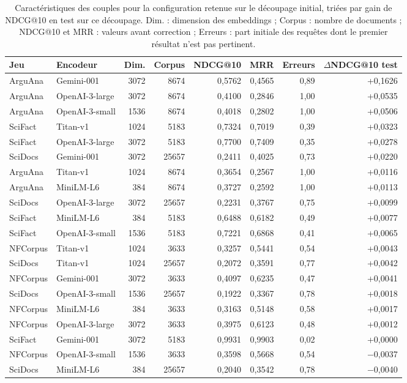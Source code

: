 \documentclass[a4paper,10pt]{article}
\begin{document}
\begin{table}[p]
\centering
\small
\begin{tabular}{llrrrrrr}
\toprule
Jeu & Encodeur & Dim. & Corpus & NDCG@10 & MRR & Erreurs & $\Delta$NDCG@10 test \\
\midrule
ArguAna & Gemini-001 & 3072 & 8674 & 0,5762 & 0,4565 & 0,89 & +0,1626 \\
ArguAna & OpenAI-3-large & 3072 & 8674 & 0,4100 & 0,2846 & 1,00 & +0,0535 \\
ArguAna & OpenAI-3-small & 1536 & 8674 & 0,4018 & 0,2802 & 1,00 & +0,0506 \\
SciFact & Titan-v1 & 1024 & 5183 & 0,7324 & 0,7019 & 0,39 & +0,0323 \\
SciFact & OpenAI-3-large & 3072 & 5183 & 0,7700 & 0,7409 & 0,35 & +0,0278 \\
SciDocs & Gemini-001 & 3072 & 25657 & 0,2411 & 0,4025 & 0,73 & +0,0220 \\
ArguAna & Titan-v1 & 1024 & 8674 & 0,3654 & 0,2567 & 1,00 & +0,0116 \\
ArguAna & MiniLM-L6 & 384 & 8674 & 0,3727 & 0,2592 & 1,00 & +0,0113 \\
SciDocs & OpenAI-3-large & 3072 & 25657 & 0,2231 & 0,3767 & 0,75 & +0,0099 \\
SciFact & MiniLM-L6 & 384 & 5183 & 0,6488 & 0,6182 & 0,49 & +0,0077 \\
SciFact & OpenAI-3-small & 1536 & 5183 & 0,7221 & 0,6868 & 0,41 & +0,0065 \\
NFCorpus & Titan-v1 & 1024 & 3633 & 0,3257 & 0,5441 & 0,54 & +0,0043 \\
SciDocs & Titan-v1 & 1024 & 25657 & 0,2072 & 0,3591 & 0,77 & +0,0042 \\
NFCorpus & Gemini-001 & 3072 & 3633 & 0,4097 & 0,6235 & 0,47 & +0,0041 \\
SciDocs & OpenAI-3-small & 1536 & 25657 & 0,1922 & 0,3367 & 0,78 & +0,0018 \\
NFCorpus & MiniLM-L6 & 384 & 3633 & 0,3163 & 0,5148 & 0,58 & +0,0017 \\
NFCorpus & OpenAI-3-large & 3072 & 3633 & 0,3975 & 0,6123 & 0,48 & +0,0012 \\
SciFact & Gemini-001 & 3072 & 5183 & 0,9931 & 0,9903 & 0,02 & +0,0000 \\
NFCorpus & OpenAI-3-small & 1536 & 3633 & 0,3598 & 0,5668 & 0,54 & $-$0,0037 \\
SciDocs & MiniLM-L6 & 384 & 25657 & 0,2040 & 0,3542 & 0,78 & $-$0,0040 \\
\bottomrule
\end{tabular}
\caption{Caractéristiques des couples pour la configuration retenue sur le découpage initial, triées par gain de NDCG@10 en test sur ce découpage. Dim. : dimension des embeddings ; Corpus : nombre de documents ; NDCG@10 et MRR : valeurs avant correction ; Erreurs : part initiale des requêtes dont le premier résultat n'est pas pertinent.}
\label{tab:s-covariables}
\end{table}
\end{document}
